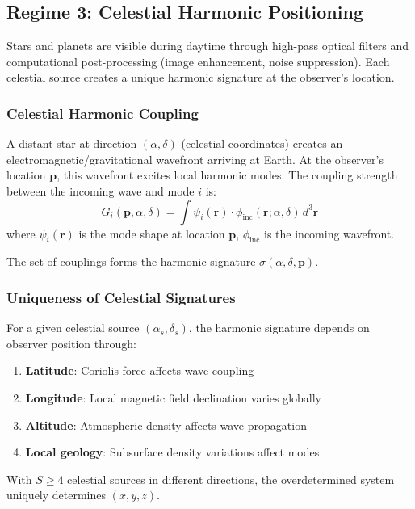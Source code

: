 \documentclass[11pt,twocolumn,a4paper]{article}
\theoremstyle{definition}
\begin{document}
\subsection{Regime 3: Celestial Harmonic Positioning}

Stars and planets are visible during daytime through high-pass optical filters and computational post-processing (image enhancement, noise suppression). Each celestial source creates a unique harmonic signature at the observer's location.

\subsubsection{Celestial Harmonic Coupling}

A distant star at direction $(\alpha, \delta)$ (celestial coordinates) creates an electromagnetic/gravitational wavefront arriving at Earth. At the observer's location $\mathbf{p}$, this wavefront excites local harmonic modes. The coupling strength between the incoming wave and mode $i$ is:
\[
G_i(\mathbf{p}, \alpha, \delta) = \int \psi_i(\mathbf{r}) \cdot \phi_{\text{inc}}(\mathbf{r}; \alpha, \delta) \, d^3\mathbf{r}
\]
where $\psi_i(\mathbf{r})$ is the mode shape at location $\mathbf{p}$, $\phi_{\text{inc}}$ is the incoming wavefront.

The set of couplings forms the harmonic signature $\sigma(\alpha, \delta, \mathbf{p})$.

\subsubsection{Uniqueness of Celestial Signatures}

For a given celestial source $(\alpha_s, \delta_s)$, the harmonic signature depends on observer position through:
\begin{enumerate}[nosep]
\item \textbf{Latitude}: Coriolis force affects wave coupling
\item \textbf{Longitude}: Local magnetic field declination varies globally
\item \textbf{Altitude}: Atmospheric density affects wave propagation
\item \textbf{Local geology}: Subsurface density variations affect modes
\end{enumerate}

With $S \geq 4$ celestial sources in different directions, the overdetermined system uniquely determines $(x, y, z)$.
\end{document}
